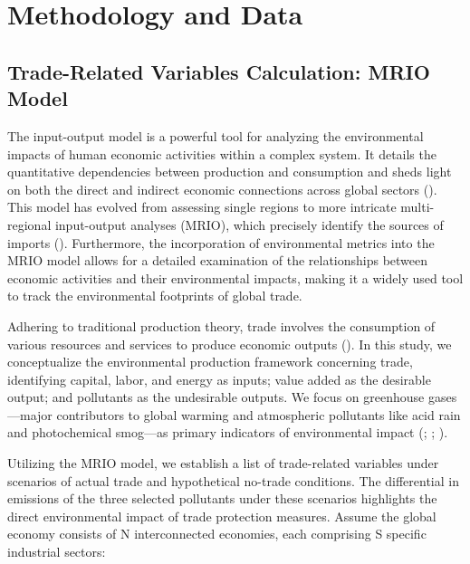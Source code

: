 \chapter{Methodology and Data}
\label{chap:METHODOLOGY AND DATA}

\section{Trade-Related Variables Calculation: MRIO Model}

The input-output model is a powerful tool for analyzing the environmental impacts of human economic activities within a complex system. It details the quantitative dependencies between production and consumption and sheds light on both the direct and indirect economic connections across global sectors (). This model has evolved from assessing single regions to more intricate multi-regional input-output analyses (MRIO), which precisely identify the sources of imports (). Furthermore, the incorporation of environmental metrics into the MRIO model allows for a detailed examination of the relationships between economic activities and their environmental impacts, making it a widely used tool to track the environmental footprints of global trade.

Adhering to traditional production theory, trade involves the consumption of various resources and services to produce economic outputs (). In this study, we conceptualize the environmental production framework concerning trade, identifying capital, labor, and energy as inputs; value added as the desirable output; and pollutants as the undesirable outputs. We focus on greenhouse gases—major contributors to global warming and atmospheric pollutants like acid rain and photochemical smog—as primary indicators of environmental impact (; ; ).

Utilizing the MRIO model, we establish a list of trade-related variables under scenarios of actual trade and hypothetical no-trade conditions. The differential in emissions of the three selected pollutants under these scenarios highlights the direct environmental impact of trade protection measures. Assume the global economy consists of N interconnected economies, each comprising S specific industrial sectors:

